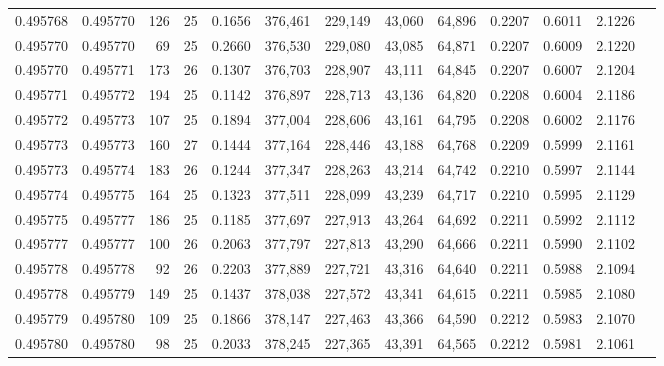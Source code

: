 \begin{tabular}{rrrrrrrrrrrrr}
0.495768 & 0.495770 & 126 &  25 &                                     0.1656 & 376,461 & 229,149 &  43,060 &  64,896 & 0.2207 & 0.6011 & 2.1226 \\
0.495770 & 0.495770 &  69 &  25 &                                     0.2660 & 376,530 & 229,080 &  43,085 &  64,871 & 0.2207 & 0.6009 & 2.1220 \\
0.495770 & 0.495771 & 173 &  26 &                                     0.1307 & 376,703 & 228,907 &  43,111 &  64,845 & 0.2207 & 0.6007 & 2.1204 \\
0.495771 & 0.495772 & 194 &  25 &                                     0.1142 & 376,897 & 228,713 &  43,136 &  64,820 & 0.2208 & 0.6004 & 2.1186 \\
0.495772 & 0.495773 & 107 &  25 &                                     0.1894 & 377,004 & 228,606 &  43,161 &  64,795 & 0.2208 & 0.6002 & 2.1176 \\
0.495773 & 0.495773 & 160 &  27 &                                     0.1444 & 377,164 & 228,446 &  43,188 &  64,768 & 0.2209 & 0.5999 & 2.1161 \\
0.495773 & 0.495774 & 183 &  26 &                                     0.1244 & 377,347 & 228,263 &  43,214 &  64,742 & 0.2210 & 0.5997 & 2.1144 \\
0.495774 & 0.495775 & 164 &  25 &                                     0.1323 & 377,511 & 228,099 &  43,239 &  64,717 & 0.2210 & 0.5995 & 2.1129 \\
0.495775 & 0.495777 & 186 &  25 &                                     0.1185 & 377,697 & 227,913 &  43,264 &  64,692 & 0.2211 & 0.5992 & 2.1112 \\
0.495777 & 0.495777 & 100 &  26 &                                     0.2063 & 377,797 & 227,813 &  43,290 &  64,666 & 0.2211 & 0.5990 & 2.1102 \\
0.495778 & 0.495778 &  92 &  26 &                                     0.2203 & 377,889 & 227,721 &  43,316 &  64,640 & 0.2211 & 0.5988 & 2.1094 \\
0.495778 & 0.495779 & 149 &  25 &                                     0.1437 & 378,038 & 227,572 &  43,341 &  64,615 & 0.2211 & 0.5985 & 2.1080 \\
0.495779 & 0.495780 & 109 &  25 &                                     0.1866 & 378,147 & 227,463 &  43,366 &  64,590 & 0.2212 & 0.5983 & 2.1070 \\
0.495780 & 0.495780 &  98 &  25 &                                     0.2033 & 378,245 & 227,365 &  43,391 &  64,565 & 0.2212 & 0.5981 & 2.1061 \\

\end{tabular}
